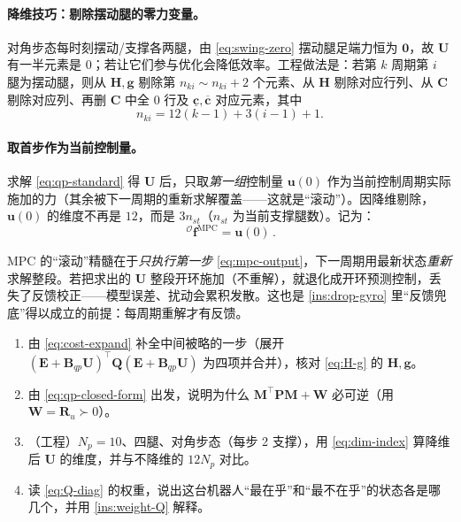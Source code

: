 \paragraph{降维技巧：剔除摆动腿的零力变量。}
对角步态每时刻摆动/支撑各两腿，由 \cref{eq:swing-zero} 摆动腿足端力恒为 $\mathbf{0}$，故 $\mathbf{U}$ 有一半元素是 $0$；若让它们参与优化会降低效率。工程做法是：若第 $k$ 周期第 $i$ 腿为摆动腿，则从 $\mathbf{H},\mathbf{g}$ 剔除第 $n_{ki}\!\sim\!n_{ki}+2$ 个元素、从 $\mathbf{H}$ 剔除对应行列、从 $\mathbf{C}$ 剔除对应列、再删 $\mathbf{C}$ 中全 $0$ 行及 $\underline{\mathbf{c}},\overline{\mathbf{c}}$ 对应元素，其中\cite{yu2021quadruped}
\begin{equation}
  n_{ki}=12(k-1)+3(i-1)+1.
  \label{eq:dim-index}
\end{equation}

\paragraph{取首步作为当前控制量。}
求解 \cref{eq:qp-standard} 得 $\mathbf{U}$ 后，只取\emph{第一组}控制量 $\boldsymbol{u}(0)$ 作为当前控制周期实际施加的力（其余被下一周期的重新求解覆盖——这就是“滚动”）。因降维剔除，$\boldsymbol{u}(0)$ 的维度不再是 $12$，而是 $3n_{st}$（$n_{st}$ 为当前支撑腿数）。记为\cite{yu2021quadruped}：
\begin{equation}
  \boxed{\,{}^{\mathcal{O}}\boldsymbol{f}^{\mathrm{MPC}}=\boldsymbol{u}(0)\,}.
  \label{eq:mpc-output}
\end{equation}

\begin{pitfall}
MPC 的“滚动”精髓在于\emph{只执行第一步} \cref{eq:mpc-output}，下一周期用最新状态\emph{重新}求解整段。若把求出的 $\mathbf{U}$ 整段开环施加（不重解），就退化成开环预测控制，丢失了反馈校正——模型误差、扰动会累积发散。这也是 \cref{ins:drop-gyro} 里“反馈兜底”得以成立的前提：每周期重解才有反馈。
\end{pitfall}

\begin{practice}
\begin{enumerate}
  \item 由 \cref{eq:cost-expand} 补全中间被略的一步（展开 $(\mathbf{E}+\mathbf{B}_{qp}\mathbf{U})^\top\mathbf{Q}(\mathbf{E}+\mathbf{B}_{qp}\mathbf{U})$ 为四项并合并），核对 \cref{eq:H-g} 的 $\mathbf{H},\mathbf{g}$。
  \item 由 \cref{eq:qp-closed-form} 出发，说明为什么 $\mathbf{M}^\top\mathbf{P}\mathbf{M}+\mathbf{W}$ 必可逆（用 $\mathbf{W}=\mathbf{R}_u\succ0$）。
  \item （工程）$N_p=10$、四腿、对角步态（每步 2 支撑），用 \cref{eq:dim-index} 算降维后 $\mathbf{U}$ 的维度，并与不降维的 $12N_p$ 对比。
  \item 读 \cref{eq:Q-diag} 的权重，说出这台机器人“最在乎”和“最不在乎”的状态各是哪几个，并用 \cref{ins:weight-Q} 解释。
\end{enumerate}
\end{practice}

